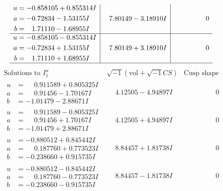 \documentclass[1p]{elsarticle_modified}
\theoremstyle{definition}
\newcommand{\I}{\sqrt{-1}}
\begin{document}
$$\begin{array}{c|c|c}
\begin{aligned}
u &= -0.858105 + 0.855314 I \\
a &= -0.72834 - 1.53155 I \\
b &= \phantom{-}1.71110 - 1.68955 I\end{aligned}
 & \phantom{-}7.80149 - 3.18910 I & \phantom{-0.000000 } 0 \\ \hline\begin{aligned}
u &= -0.858105 - 0.855314 I \\
a &= -0.72834 + 1.53155 I \\
b &= \phantom{-}1.71110 + 1.68955 I\end{aligned}
 & \phantom{-}7.80149 + 3.18910 I & \phantom{-0.000000 } 0\\
 \hline 
 \end{array}$$\newpage$$\begin{array}{c|c|c}  
\text{Solutions to }I^u_{1}& \I (\text{vol} + \sqrt{-1}CS) & \text{Cusp shape}\\
 \hline 
\begin{aligned}
u &= \phantom{-}0.911589 + 0.805325 I \\
a &= \phantom{-}0.91456 - 1.70167 I \\
b &= -1.01479 - 2.88671 I\end{aligned}
 & \phantom{-}4.12505 - 4.94897 I & \phantom{-0.000000 } 0 \\ \hline\begin{aligned}
u &= \phantom{-}0.911589 - 0.805325 I \\
a &= \phantom{-}0.91456 + 1.70167 I \\
b &= -1.01479 + 2.88671 I\end{aligned}
 & \phantom{-}4.12505 + 4.94897 I & \phantom{-0.000000 } 0 \\ \hline\begin{aligned}
u &= -0.880512 + 0.845442 I \\
a &= \phantom{-}0.187760 + 0.773523 I \\
b &= -0.238660 + 0.915735 I\end{aligned}
 & \phantom{-}8.84457 + 1.81738 I & \phantom{-0.000000 } 0 \\ \hline\begin{aligned}
u &= -0.880512 - 0.845442 I \\
a &= \phantom{-}0.187760 - 0.773523 I \\
b &= -0.238660 - 0.915735 I\end{aligned}
 & \phantom{-}8.84457 - 1.81738 I & \phantom{-0.000000 } 0 \\ \hline\begin{aligned}

\end{aligned}
\end{array}$$
\end{document}
